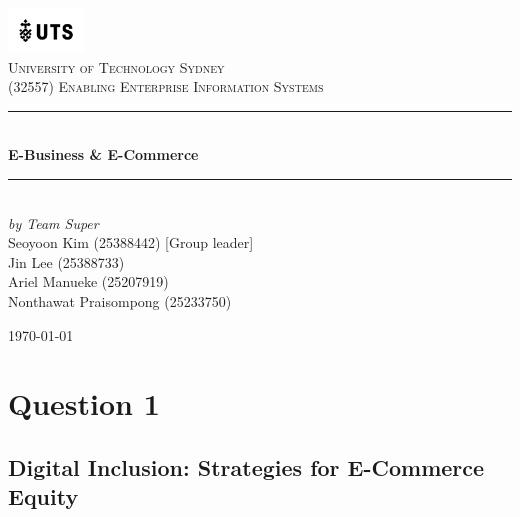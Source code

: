 \documentclass[12pt,a4paper]{article}
\begin{document}

\begin{titlepage}

\newcommand{\HRule}{\rule{\linewidth}{0.5mm}}
\center

\vspace*{1\baselineskip}
\includegraphics[width=0.15\textwidth]{images/UTS.png}\\
\textsc{\LARGE University of Technology Sydney}\\[2.0cm]
\textsc{\Large (32557) Enabling Enterprise Information Systems}\\[0.2cm]

\HRule\\[0.6cm]
{\huge\bfseries E-Business \& E-Commerce}\\[0.4cm]
\HRule\\[10cm]

\emph{by Team Super} \\
{ Seoyoon Kim (25388442) [Group leader] \\}
{ Jin Lee (25388733)  \\}
{ Ariel Manueke (25207919) \\}
{ Nonthawat Praisompong (25233750) \\}

\vfill
{\large\today}

\vfill

\end{titlepage}


\tableofcontents
\thispagestyle{nofooter}
\cleardoublepage

\pagebreak





\setcounter{page}{1}

\section{Question 1}
\subsection{Digital Inclusion: Strategies for E-Commerce Equity}
\end{document}
